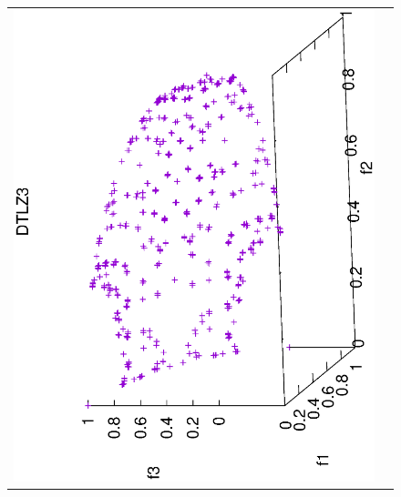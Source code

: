 \begin{figure}[H]
\begin{tabular}{cc}
  \includegraphics[scale=0.3, angle=-90,origin=c]{Figures_Chapter7/Results_Chapter4/Summary_Representative/VSD-MOEA/DTLZ3.eps} &

\end{tabular}
\end{figure}
